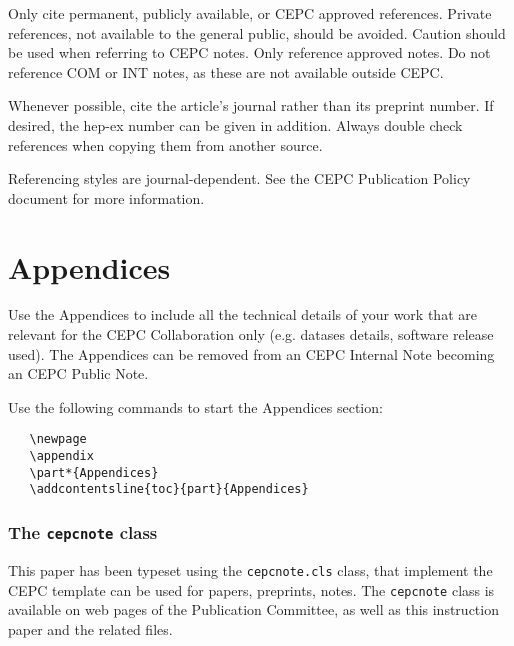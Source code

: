 \documentclass[11pt,a4paper]{cepcnote}
\begin{document}
Only cite permanent, publicly available, or CEPC approved references.
Private references, not available to the general public, should be
avoided. Caution should be used when referring to CEPC notes.
Only reference approved notes. Do not reference COM or INT notes,
as these are not available outside CEPC.

Whenever possible, cite the article's journal rather than its
preprint number. If desired, the hep-ex number can be given in
addition. Always double check references when copying them from
another source.

Referencing styles are journal-dependent. See the CEPC Publication
Policy document for more information.






\newpage
\appendix
\part*{Appendices}

Use the Appendices to include all the technical details of your work
that are relevant for the CEPC Collaboration only (e.g. datases
details, software release used). The Appendices can be removed from
an CEPC Internal Note becoming an CEPC Public Note.

Use the following commands to start the Appendices section:
\begin{verbatim}
   \newpage
   \appendix
   \part*{Appendices}
   \addcontentsline{toc}{part}{Appendices}
\end{verbatim}

\section{The {\tt cepcnote} class}
\label{app:CepcNoteCls}

This paper has been typeset using the {\tt cepcnote.cls} class, that
implement the CEPC template can be used for papers, preprints,
notes. The {\tt cepcnote} class is available on web pages of the
Publication Committee, as well as this instruction paper and the
related files.
\end{document}
